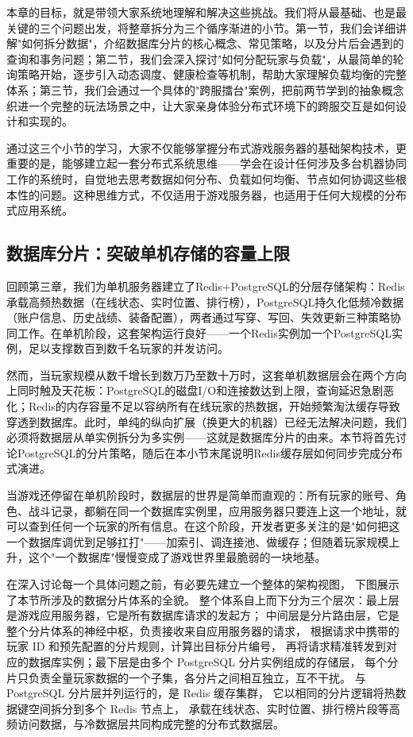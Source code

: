 本章的目标，就是带领大家系统地理解和解决这些挑战。我们将从最基础、也是最关键的三个问题出发，将整章拆分为三个循序渐进的小节。第一节，我们会详细讲解"如何拆分数据"，介绍数据库分片的核心概念、常见策略，以及分片后会遇到的查询和事务问题；第二节，我们会深入探讨"如何分配玩家与负载"，从最简单的轮询策略开始，逐步引入动态调度、健康检查等机制，帮助大家理解负载均衡的完整体系；第三节，我们会通过一个具体的"跨服擂台"案例，把前两节学到的抽象概念织进一个完整的玩法场景之中，让大家亲身体验分布式环境下的跨服交互是如何设计和实现的。

通过这三个小节的学习，大家不仅能够掌握分布式游戏服务器的基础架构技术，更重要的是，能够建立起一套分布式系统思维——学会在设计任何涉及多台机器协同工作的系统时，自觉地去思考数据如何分布、负载如何均衡、节点如何协调这些根本性的问题。这种思维方式，不仅适用于游戏服务器，也适用于任何大规模的分布式应用系统。


\subsection{数据库分片：突破单机存储的容量上限}

回顾第三章，我们为单机服务器建立了Redis+PostgreSQL的分层存储架构：Redis承载高频热数据（在线状态、实时位置、排行榜），PostgreSQL持久化低频冷数据（账户信息、历史战绩、装备配置），两者通过写穿、写回、失效更新三种策略协同工作。在单机阶段，这套架构运行良好——一个Redis实例加一个PostgreSQL实例，足以支撑数百到数千名玩家的并发访问。

然而，当玩家规模从数千增长到数万乃至数十万时，这套单机数据层会在两个方向上同时触及天花板：PostgreSQL的磁盘I/O和连接数达到上限，查询延迟急剧恶化；Redis的内存容量不足以容纳所有在线玩家的热数据，开始频繁淘汰缓存导致穿透到数据库。此时，单纯的纵向扩展（换更大的机器）已经无法解决问题，我们必须将数据层从单实例拆分为多实例——这就是数据库分片的由来。本节将首先讨论PostgreSQL的分片策略，随后在本小节末尾说明Redis缓存层如何同步完成分布式演进。

当游戏还停留在单机阶段时，数据层的世界是简单而直观的：所有玩家的账号、角色、战斗记录，都躺在同一个数据库实例里，应用服务器只要连上这一个地址，就可以查到任何一个玩家的所有信息。在这个阶段，开发者更多关注的是"如何把这一个数据库调优到足够扛打"——加索引、调连接池、做缓存；但随着玩家规模上升，这个"一个数据库"慢慢变成了游戏世界里最脆弱的一块地基。

在深入讨论每一个具体问题之前，有必要先建立一个整体的架构视图，
下图展示了本节所涉及的数据分片体系的全貌。
整个体系自上而下分为三个层次：最上层是游戏应用服务器，它是所有数据库请求的发起方；
中间层是分片路由层，它是整个分片体系的神经中枢，负责接收来自应用服务器的请求，
根据请求中携带的玩家 ID 和预先配置的分片规则，计算出目标分片编号，
再将请求精准转发到对应的数据库实例；最下层是由多个 PostgreSQL 分片实例组成的存储层，
每个分片只负责全量玩家数据的一个子集，各分片之间相互独立，互不干扰。
与 PostgreSQL 分片层并列运行的，是 Redis 缓存集群，
它以相同的分片逻辑将热数据键空间拆分到多个 Redis 节点上，
承载在线状态、实时位置、排行榜片段等高频访问数据，与冷数据层共同构成完整的分布式数据层。

